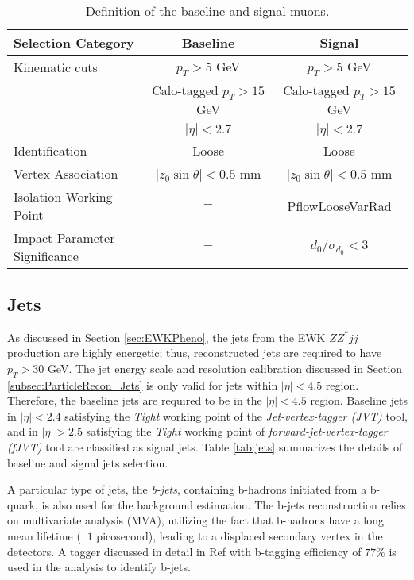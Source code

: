 \begin{table}[!htbp]
    \centering
        \caption{Definition of the baseline and signal muons.\label{tab:muon_baseline_signal}}
        \begin{tabular}{|| l || c | c ||}
        \hline
        Selection Category & \textbf{Baseline} & \textbf{Signal} \\
        \hline\hline
        Kinematic cuts & $p_{T} > 5$ GeV & $p_{T} > 5$ GeV \\
                    & Calo-tagged $ p_{T} > 15$ GeV & Calo-tagged $ p_{T} > 15$ GeV \\
              & $|\eta| < 2.7$ & $|\eta| < 2.7$\\
        \hline
        Identification & Loose & Loose \\
        \hline 
        Vertex Association & $|z_{0}\sin\theta| < 0.5$ mm & $|z_{0}\sin\theta|< 0.5$ mm\\
        \hline
        Isolation Working Point & $-$ & PflowLooseVarRad\\
        \hline 
        Impact Parameter Significance & $-$ & $d_{0}/\sigma_{d_{0}} < 3$ \\
        \hline
    \end{tabular}
\end{table}

\subsection{Jets}
\label{subsec:JetRecon} 
As discussed in Section \ref{sec:EWKPheno}, the jets from the EWK $ZZ^*jj$ production are highly energetic; thus, reconstructed jets are required to have $p_{T} > 30$ GeV. The jet energy scale and resolution calibration discussed in Section \ref{subsec:ParticleRecon_Jets} is only valid for jets within $ |\eta| < 4.5 $ region. Therefore, the baseline jets are required to be in the $ |\eta| < 4.5 $ region. Baseline jets in $ |\eta| < 2.4 $ satisfying the \textit{Tight} working point of the \textit{Jet-vertex-tagger (JVT)} tool, and in $ |\eta| > 2.5 $ satisfying the \textit{Tight} working point of \textit{forward-jet-vertex-tagger (fJVT)} tool are classified as signal jets. Table \ref{tab:jets} summarizes the details of baseline and signal jets selection. 

A particular type of jets, the \textit{b-jets}, containing b-hadrons initiated from a b-quark, is also used for the background estimation. The b-jets reconstruction relies on multivariate analysis (MVA), utilizing the fact that b-hadrons have a long mean lifetime ( $~1$ picosecond), leading to a displaced secondary vertex in the detectors. A tagger discussed in detail in Ref \cite{bTagging} with b-tagging efficiency of $77\%$ is used in the analysis to identify b-jets.

